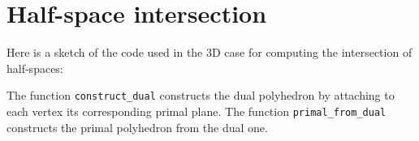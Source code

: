 \chapter{Half-space intersection}
\label{appendix:code-intersection}

Here is a sketch of the code used in the 3D case for computing the intersection
of half-spaces:



The function \texttt{construct\_dual} constructs the dual polyhedron by
attaching to each vertex its corresponding primal plane. The function
\texttt{primal\_from\_dual} constructs the primal polyhedron from the dual one.


